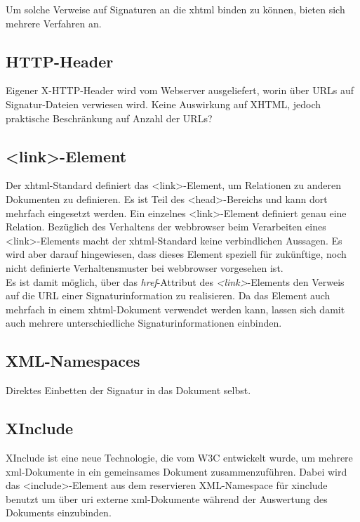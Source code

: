 Um solche Verweise auf Signaturen an die \gls{xhtml} binden zu können, bieten sich mehrere Verfahren an.

\subsection{HTTP-Header}
Eigener X-HTTP-Header wird vom Webserver ausgeliefert, worin über URLs auf Signatur-Dateien verwiesen wird. Keine Auswirkung auf XHTML, jedoch praktische Beschränkung
auf Anzahl der URLs?

\subsection{<link>-Element}
Der \gls{xhtml}-Standard definiert das <link>-Element, um Relationen zu anderen Dokumenten zu definieren\cite{xhtml:oreilly}. Es ist Teil des <head>-Bereichs
und kann dort mehrfach eingesetzt werden. Ein einzelnes <link>-Element definiert genau eine Relation. Bezüglich des Verhaltens der \gls{webbrowser} beim
Verarbeiten eines <link>-Elements macht der \gls{xhtml}-Standard keine verbindlichen Aussagen. Es wird aber darauf hingewiesen, dass dieses Element speziell für
zukünftige, noch nicht definierte Verhaltensmuster bei \Gls{webbrowser} vorgesehen ist.\\
Es ist damit möglich, über das \textit{href}-Attribut des \textit{<link>}-Elements den Verweis auf die URL einer Signaturinformation zu realisieren. Da das
Element auch mehrfach in einem \gls{xhtml}-Dokument verwendet werden kann, lassen sich damit auch mehrere unterschiedliche Signaturinformationen einbinden.



\subsection{XML-Namespaces}
Direktes Einbetten der Signatur in das Dokument selbst.



\subsection{XInclude}
XInclude ist eine neue Technologie, die vom W3C entwickelt wurde, um mehrere \gls{xml}-Dokumente in ein gemeinsames Dokument zusammenzuführen\cite{xml:oreilly}.
Dabei wird das <include>-Element aus dem reservieren XML-Namespace für \gls{xinclude} benutzt um über \gls{uri} externe \gls{xml}-Dokumente während der
Auswertung des Dokuments einzubinden.


